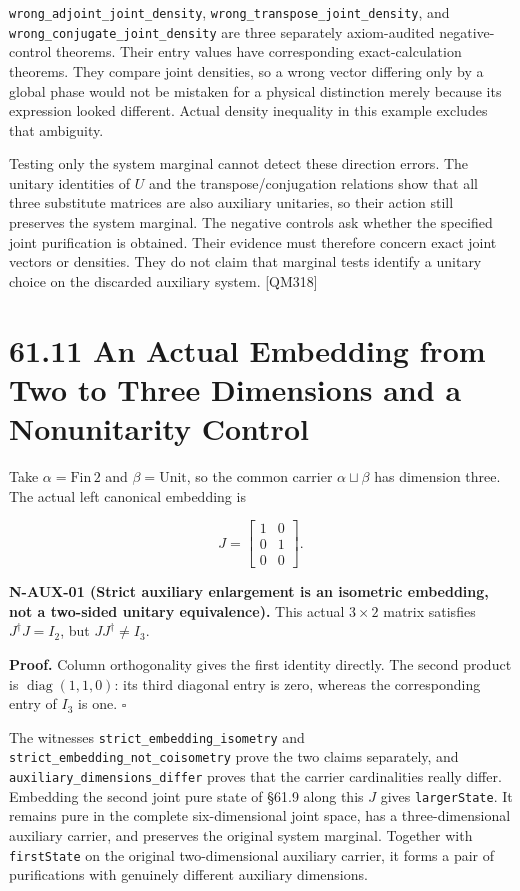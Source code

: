 \documentclass[
  11pt,
  oneside]{book}
\begin{document}
\texttt{wrong\_\allowbreak adjoint\_\allowbreak joint\_\allowbreak density},
\texttt{wrong\_\allowbreak transpose\_\allowbreak joint\_\allowbreak density}, and
\texttt{wrong\_\allowbreak conjugate\_\allowbreak joint\_\allowbreak density} are three separately
axiom-audited negative-control theorems. Their entry values have
corresponding exact-calculation theorems. They compare joint densities,
so a wrong vector differing only by a global phase would not be mistaken
for a physical distinction merely because its expression looked
different. Actual density inequality in this example excludes that
ambiguity.

Testing only the system marginal cannot detect these direction errors.
The unitary identities of \(U\) and the transpose/conjugation relations
show that all three substitute matrices are also auxiliary unitaries, so
their action still preserves the system marginal. The negative controls
ask whether the specified joint purification is obtained. Their evidence
must therefore concern exact joint vectors or densities. They do not
claim that marginal tests identify a unitary choice on the discarded
auxiliary system. {[}QM318{]}

\section{61.11 An Actual Embedding from Two to Three Dimensions and a
Nonunitarity Control}

Take \(\alpha=\mathrm{Fin}\,2\) and \(\beta=\mathrm{Unit}\), so the
common carrier \(\alpha\sqcup\beta\) has dimension three. The actual
left canonical embedding is

\[
J=\begin{bmatrix}1&0\\0&1\\0&0\end{bmatrix}.
\]

\label{n-aux-01}{}

\textbf{N-AUX-01 (Strict auxiliary enlargement is an isometric
embedding, not a two-sided unitary equivalence).} This actual
\(3\times2\) matrix satisfies \(J^\dagger J=I_2\), but
\(JJ^\dagger\ne I_3\).

\textbf{Proof.} Column orthogonality gives the first identity directly.
The second product is \(\operatorname{diag}(1,1,0)\): its third diagonal
entry is zero, whereas the corresponding entry of \(I_3\) is one.
\(\square\)

The witnesses \texttt{strict\_\allowbreak embedding\_\allowbreak isometry} and
\texttt{strict\_\allowbreak embedding\_\allowbreak not\_\allowbreak coisometry} prove the two claims
separately, and \texttt{auxiliary\_\allowbreak dimensions\_\allowbreak differ} proves that the
carrier cardinalities really differ. Embedding the second joint pure
state of §61.9 along this \(J\) gives \texttt{larger\allowbreak State}. It remains
pure in the complete six-dimensional joint space, has a
three-dimensional auxiliary carrier, and preserves the original system
marginal. Together with \texttt{first\allowbreak State} on the original
two-dimensional auxiliary carrier, it forms a pair of purifications with
genuinely different auxiliary dimensions.
\end{document}
